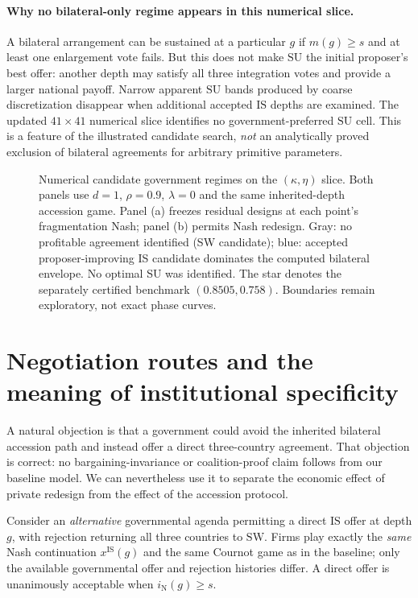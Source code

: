 \documentclass[11pt,a4paper]{article}
\theoremstyle{remark}\newtheorem{remark}[theorem]{Remark}
\newcommand{\SW}{\mathrm{SW}}\newcommand{\SU}{\mathrm{SU}}\newcommand{\IS}{\mathrm{IS}}
\newcommand{\N}{\mathrm{N}}\newcommand{\F}{\mathrm{F}}
\begin{document}
\paragraph{Why no bilateral-only regime appears in this numerical slice.}
A bilateral arrangement can be sustained at a particular $g$ if $m(g)\ge s$ and at least one enlargement vote fails. But this does not make $\SU$ the initial proposer's best offer: another depth may satisfy all three integration votes and provide a larger national payoff. Narrow apparent $\SU$ bands produced by coarse discretization disappear when additional accepted $\IS$ depths are examined. The updated $41\times41$ numerical slice identifies no government-preferred $\SU$ cell. This is a feature of the illustrated candidate search, \emph{not} an analytically proved exclusion of bilateral agreements for arbitrary primitive parameters.

\begin{figure}[H]
\centering
\resizebox{0.98\linewidth}{!}{}
\caption{Numerical candidate government regimes on the $(\kappa,\eta)$ slice. Both panels use $d=1$, $\rho=0.9$, $\lambda=0$ and the same inherited-depth accession game. Panel (a) freezes residual designs at each point's fragmentation Nash; panel (b) permits Nash redesign. Gray: no profitable agreement identified (SW candidate); blue: accepted proposer-improving IS candidate dominates the computed bilateral envelope. No optimal SU was identified. The star denotes the separately certified benchmark $(0.8505,0.758)$. Boundaries remain exploratory, not exact phase curves.}
\label{fig:phase}
\end{figure}

\section{Negotiation routes and the meaning of institutional specificity}\label{sec:institution}
A natural objection is that a government could avoid the inherited bilateral accession path and instead offer a direct three-country agreement. That objection is correct: no bargaining-invariance or coalition-proof claim follows from our baseline model. We can nevertheless use it to separate the economic effect of private redesign from the effect of the accession protocol.

Consider an \emph{alternative} governmental agenda permitting a direct $\IS$ offer at depth $g$, with rejection returning all three countries to $\SW$. Firms play exactly the \emph{same} Nash continuation $x^{\IS}(g)$ and the same Cournot game as in the baseline; only the available governmental offer and rejection histories differ. A direct offer is unanimously acceptable when $i_{\N}(g)\ge s$.
\end{document}
